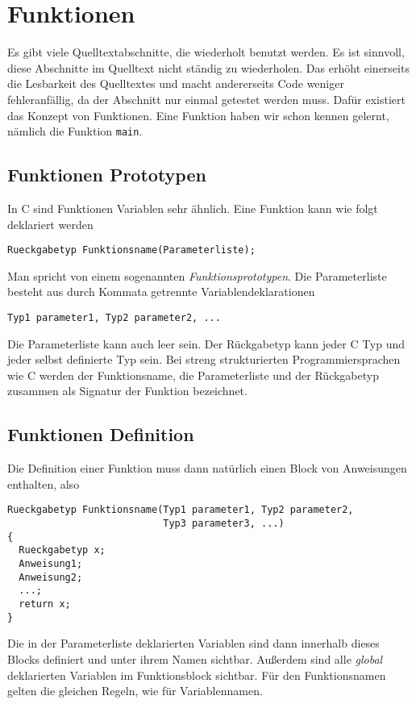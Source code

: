 \section{Funktionen}

Es gibt viele Quelltextabschnitte, die wiederholt benutzt werden.
Es ist sinnvoll, diese Abschnitte im Quelltext nicht ständig zu wiederholen.
Das erhöht einerseits die Lesbarkeit des Quelltextes und macht andererseits Code weniger fehleranfällig, da der Abschnitt nur einmal getestet werden muss.
Dafür existiert das Konzept von Funktionen.
Eine Funktion haben wir schon kennen gelernt, nämlich die Funktion \verb|main|. 

\subsection{Funktionen Prototypen}

In C sind Funktionen Variablen sehr ähnlich.
Eine Funktion kann wie folgt deklariert werden
\begin{lstlisting}
Rueckgabetyp Funktionsname(Parameterliste);
\end{lstlisting}
Man spricht von einem sogenannten \emph{Funktionsprototypen}.
Die Parameterliste besteht aus durch Kommata getrennte Variablendeklarationen
\begin{lstlisting}
Typ1 parameter1, Typ2 parameter2, ...
\end{lstlisting}
Die Parameterliste kann auch leer sein.
Der Rückgabetyp kann jeder C Typ und jeder selbst definierte Typ sein.
Bei streng strukturierten Programmiersprachen wie C werden der Funktionsname, die Parameterliste und der Rückgabetyp zusammen als Signatur der Funktion bezeichnet.

\subsection{Funktionen Definition}

Die Definition einer Funktion muss dann natürlich einen Block von Anweisungen enthalten, also
\begin{lstlisting}[caption={Funktionen Prototyp}, belowcaptionskip=0.3em]
Rueckgabetyp Funktionsname(Typ1 parameter1, Typ2 parameter2,
                           Typ3 parameter3, ...)
{
  Rueckgabetyp x;
  Anweisung1;
  Anweisung2;
  ...;
  return x;
}
\end{lstlisting}
Die in der Parameterliste deklarierten Variablen sind dann innerhalb dieses Blocks definiert und unter ihrem Namen sichtbar.
Außerdem sind alle \emph{global} deklarierten Variablen im Funktionsblock sichtbar.
Für den Funktionsnamen gelten die gleichen Regeln, wie für Variablennamen.

